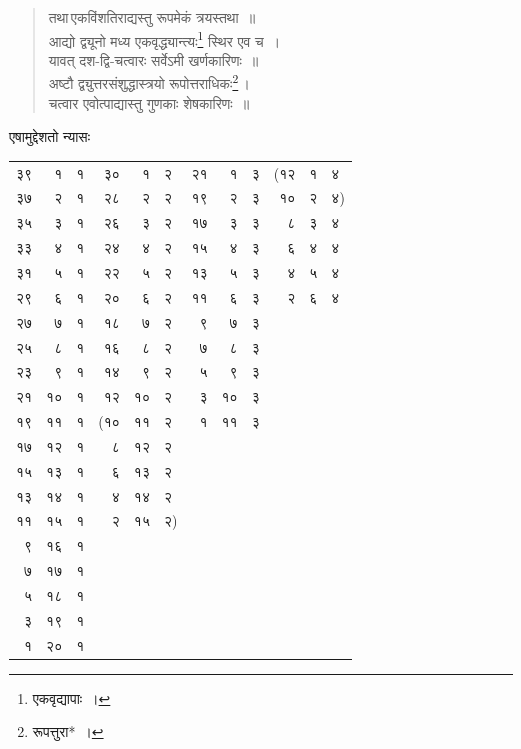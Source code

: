 \documentclass[10pt, openany]{book}
\begin{document}
{{\begin{quote}
\hspace{-9.5mm} तथा\textendash \,{\qt एकविंशतिराद्यस्तु रूपमेकं त्रयस्तथा~॥ \\
 आद्यो द्व्यूनो मध्य एकवृद्ध्यान्त्यः\renewcommand{\thefootnote}{\s ७}\footnote{\s एकवृद्यापाः~।} स्थिर एव च~। \\
 यावत् दश-द्वि-चत्वारः सर्वेऽमी खर्णकारिणः~॥ \\
 अष्टौ द्व्युत्तरसंशुद्धास्त्रयो रूपोत्तराधिकः\renewcommand{\thefootnote}{\s ८}\footnote{\s रूपत्तुरा*~।}\,। \\
 चत्वार एवोत्पाद्यास्तु गुणकाः शेषकारिणः~॥}\end{quote}

{एषामुद्देशतो न्यासः\textemdash}
\vspace{4mm}

\begin{tabular}{rrr|rrl|rrr|rrl}
 ३९ & १ & १ & ३० & १ & २ & २१ & १ & ३ & (१२ & १ & ४\\
 ३७ & २ & १ & २८ & २ & २ & १९ & २ & ३ & १० & २ & ४)\\
 \cline{10-12}
 ३५ & ३ & १ & २६ & ३ & २ & १७ & ३ & ३ & ८ & ३ & ४\\
 ३३ & ४ & १ & २४ & ४ & २ & १५ & ४ & ३ & ६ & ४ & ४\\
 ३१ & ५ & १ & २२ & ५ & २ & १३ & ५ & ३ & ४ & ५ & ४\\
 २९ & ६ & १ & २० & ६ & २ & ११ & ६ & ३ & २ & ६ & ४\\
 २७ & ७ & १ & १८ & ७ & २ & ९ & ७ & ३ \\
 २५ & ८ & १ & १६ & ८ & २ & ७ & ८ & ३ \\
 २३ & ९ & १ & १४ & ९ & २ & ५ & ९ & ३ \\
 २१ & १० & १ & १२ & १० & २ & ३ & १० & ३ \\
 १९ & ११ & १ & (१० & ११ & २ & १ & ११ & ३ \\
 १७ & १२ & १ & ८ & १२ & २ \\
 १५ & १३ & १ & ६ & १३ & २ \\
 १३ & १४ & १ & ४ & १४ & २ \\
 ११ & १५ & १ & २ & १५ & २)\\
 ९ & १६ & १ \\
 ७ & १७ & १ \\
 ५ & १८ & १ \\
 ३ & १९ & १ \\
 १ & २० & १ \\
 
\end{tabular}


\newpage

}}
\end{document}
